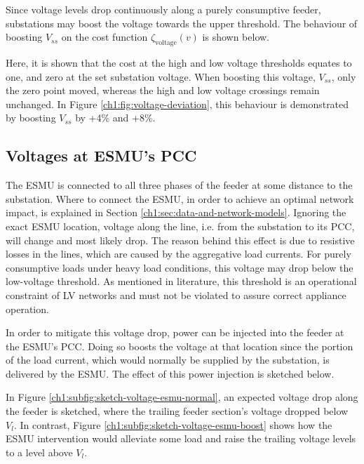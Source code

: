 

Since voltage levels drop continuously along a purely consumptive feeder, substations may boost the voltage towards the upper threshold.
The behaviour of boosting $V_{ss}$ on the cost function $\zeta_\text{voltage}(v)$ is shown below.



Here, it is shown that the cost at the high and low voltage thresholds equates to one, and zero at the set substation voltage.
When boosting this voltage, $V_{ss}$, only the zero point moved, whereas the high and low voltage crossings remain unchanged.
In Figure \ref{ch1:fig:voltage-deviation}, this behaviour is demonstrated by boosting $V_{ss}$ by +4\% and +8\%.

\subsection{Voltages at ESMU's PCC}
\label{ch1:subsec:voltages-at-esmu}

The ESMU is connected to all three phases of the feeder at some distance to the substation.
Where to connect the ESMU, in order to achieve an optimal network impact, is explained in Section \ref{ch1:sec:data-and-network-models}.
Ignoring the exact ESMU location, voltage along the line, i.e. from the substation to its PCC, will change and most likely drop.
The reason behind this effect is due to resistive losses in the lines, which are caused by the aggregative load currents.
For purely consumptive loads under heavy load conditions, this voltage may drop below the low-voltage threshold.
As mentioned in literature, this threshold is an operational constraint of LV networks and must not be violated to assure correct appliance operation.

In order to mitigate this voltage drop, power can be injected into the feeder at the ESMU's PCC.
Doing so boosts the voltage at that location since the portion of the load current, which would normally be supplied by the substation, is delivered by the ESMU.
The effect of this power injection is sketched below.



In Figure \ref{ch1:subfig:sketch-voltage-esmu-normal}, an expected voltage drop along the feeder is sketched, where the trailing feeder section's voltage dropped below $V_l$.
In contrast, Figure \ref{ch1:subfig:sketch-voltage-esmu-boost} shows how the ESMU intervention would alleviate some load and raise the trailing voltage levels to a level above $V_l$.

